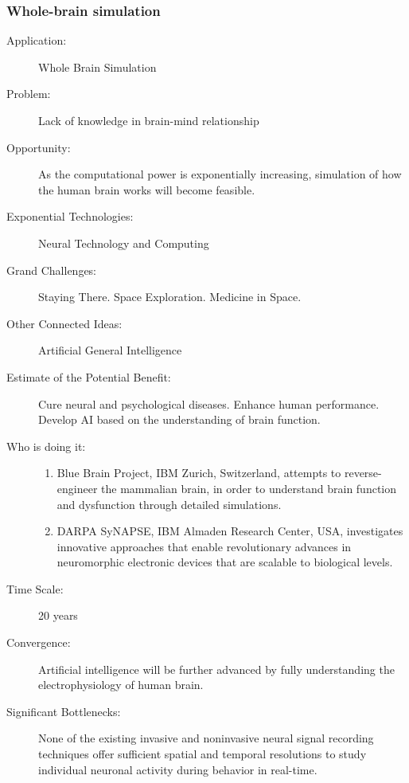  
\subsubsection{Whole-brain simulation}
\label{brain-sim}
\begin{description}  \item[Application:] Whole Brain Simulation
 
\item[Problem:] Lack of knowledge  in brain-mind relationship
 
\item[Opportunity:]  As the computational power is exponentially increasing, simulation of  how the human brain works will become feasible.
 
\item[Exponential Technologies:]  Neural Technology and Computing
 
\item[Grand Challenges:] Staying  There. Space Exploration. Medicine in Space.
 
\item[Other Connected Ideas:]  Artificial General Intelligence 
 
\item[Estimate of the Potential  Benefit:]Cure neural and psychological diseases. Enhance human  performance. Develop AI based on the understanding of brain function.
 
\item[Who  is doing it:]
\hfill\begin{enumerate}
\item Blue Brain Project, IBM  Zurich, Switzerland, attempts to reverse-engineer the mammalian brain,  in order to understand brain function and dysfunction through detailed  simulations.
\item DARPA SyNAPSE, IBM  Almaden  Research Center, USA, investigates innovative approaches that enable  revolutionary advances in neuromorphic electronic devices that are  scalable to biological levels.  
\end{enumerate}
 
\item[Time  Scale:] 20 years
 
\item[Convergence:]  Artificial intelligence will be further advanced by fully understanding  the electrophysiology of human brain.
 
\item[Significant Bottlenecks:]  None of the existing invasive and noninvasive neural signal recording  techniques offer sufficient spatial and temporal resolutions to study  individual neuronal activity during behavior in real-time.
\end{description}

